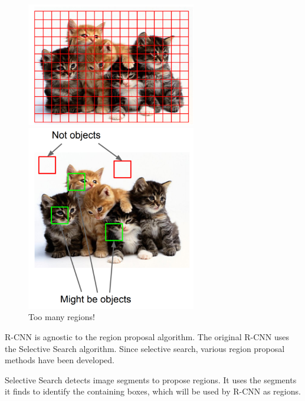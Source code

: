 \begin{figure}[H]
	\centering
	\begin{minipage}{0.45\textwidth}
		\centering
		\includegraphics[width=0.66\textwidth]{images/search.PNG} %
		\caption{Too many regions!}
		\label{f:regionscnn}
	\end{minipage}\hfill
	\begin{minipage}{0.45\textwidth}
		\centering
		\includegraphics[width=0.66\textwidth]{images/region.PNG} %
	\end{minipage}
\end{figure}

R-CNN is agnostic to the region proposal algorithm. The original R-CNN uses the Selective Search algorithm. Since selective search, various region proposal methods have been developed.

Selective Search detects image segments to propose regions. It uses the segments it finds to identify the containing boxes, which will be used by R-CNN as regions.

